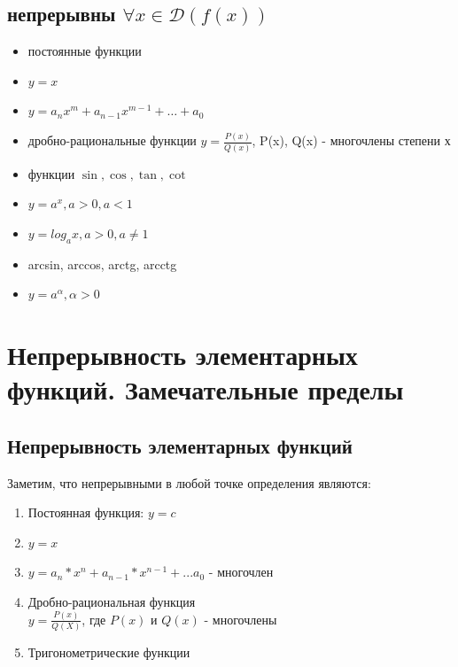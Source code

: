 \documentclass[oneside]{book}
\begin{document}
\begin{enumerate}
    \section{непрерывны $\forall x \in \mathcal{D}(f(x))$}
    \begin{itemize}
        \item постоянные функции
        \item $y = x$
        \item $y = a_n x^m + a_{n-1} x^{m-1} + \dots + a_0$
        \item дробно-рациональные функции $y = \frac{P(x)}{Q(x)}$, P(x), Q(x) - многочлены степени х
        \item функции $\sin, \cos, \tan, \cot$
        \item $y=a^x, a>0, a < 1$
        \item $y=log_ax, a > 0, a \neq 1$
        \item arcsin, arccos, arctg, arcctg
        \item $y=a^\alpha, \alpha > 0$
    \end{itemize}

    \chapter{Непрерывность элементарных функций. Замечательные пределы\\}
\section{Непрерывность элементарных функций}
Заметим, что непрерывными в любой точке определения являются:
\begin{enumerate}
\item Постоянная функция: $y=c$
\item $y=x$
\item $y=a_n*x^n+a_{n-1}*x^{n-1}+...a_0$ - многочлен
\item Дробно-рациональная функция\\$y=\frac{P(x)}{Q(X)}$, где $P(x)$ и $Q(x)$ - многочлены
\item Тригонометрические функции
\end{enumerate}

\end{enumerate}
\end{document}
